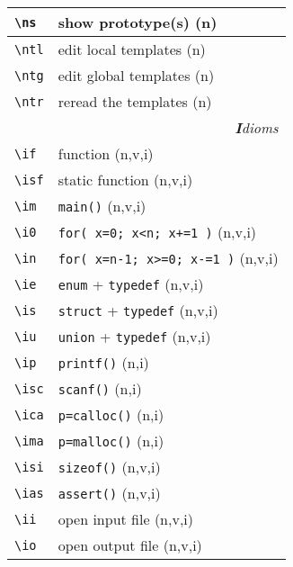 \documentclass[oneside,10pt,landscape,DIV16]{scrartcl}
\begin{document}
\begin{multicols}{3}
\begin{center}
\begin{tabular}[]{|p{11mm}|p{58mm}|}
\hline \verb'\ns'  & show   prototype(s)       \hfill (n)\\
%
\hline \verb'\ntl' & edit local templates      \hfill (n)\\
\hline \verb'\ntg' & edit global templates     \hfill (n)\\
\hline \verb'\ntr' & reread the templates      \hfill (n)\\
\hline
\hline 
\multicolumn{2}{|r|}{\textsl{\textbf{I}dioms}}   \\
\hline \verb'\if'  & function                         \hfill (n,v,i)\\
\hline \verb'\isf' & static function                  \hfill (n,v,i)\\
\hline \verb'\im'  & \verb'main()'                    \hfill (n,v,i)\\
\hline \verb'\i0'  & \verb'for( x=0; x<n; x+=1 )'     \hfill (n,v,i)\\
\hline \verb'\in'  & \verb'for( x=n-1; x>=0; x-=1 )'  \hfill (n,v,i)\\
\hline \verb'\ie'  & \verb'enum'   + \verb'typedef'   \hfill (n,v,i)\\
\hline \verb'\is'  & \verb'struct' + \verb'typedef'   \hfill (n,v,i)\\
\hline \verb'\iu'  & \verb'union'  + \verb'typedef'   \hfill (n,v,i)\\
\hline \verb'\ip'  & \verb'printf()'                  \hfill (n,i)\\
\hline \verb'\isc' & \verb'scanf()'                   \hfill (n,i)\\
\hline \verb'\ica' & \verb'p=calloc()'                \hfill (n,i)\\
\hline \verb'\ima' & \verb'p=malloc()'                \hfill (n,i)\\
\hline \verb'\isi' & \verb'sizeof()'                  \hfill (n,v,i)\\
\hline \verb'\ias' & \verb'assert()'                  \hfill (n,v,i)\\
\hline \verb'\ii'  & open input file                  \hfill (n,v,i)\\
\hline \verb'\io'  & open output file                 \hfill (n,v,i)\\
\hline
\end{tabular} \\


\end{center}
\end{multicols}
\end{document}
